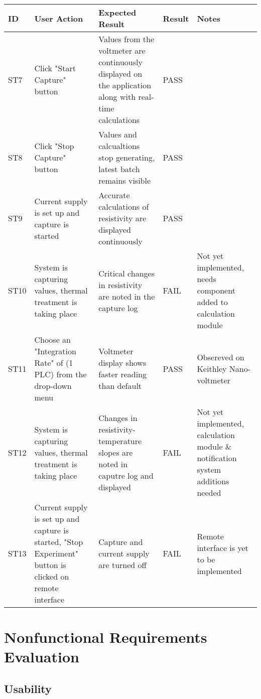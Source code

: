 \documentclass[12pt, titlepage]{article}
\begin{document}
\begin{table}[H]
	\centering
	\begin{tabular}{|p{0.85cm}|p{3.5cm}|p{3.5cm}|p{1.3cm}|p{3cm}|}
		\hline
		\textbf{ID} & \textbf{User Action} & \textbf{Expected Result}  & \textbf{Result}  & \textbf{Notes}  \\ \hline
		ST7 & Click "Start Capture" button & Values from the voltmeter are continuously displayed on the application along with real-time calculations & PASS & \\ \hline
		ST8 & Click "Stop Capture" button & Values and calcualtions stop generating, latest batch remains visible & PASS &\\ \hline
		ST9 & Current supply is set up and capture is started & Accurate calculations of resistivity are displayed continuously & PASS &\\ \hline
		ST10 & System is capturing values, thermal treatment is taking place & Critical changes in resistivity are noted in the capture log & FAIL & Not yet implemented, needs component added to calculation module\\ \hline
		ST11 & Choose an "Integration Rate" of (1 PLC) from the drop-down menu & Voltmeter display shows faster reading than default & PASS & Obsereved on Keithley Nano-voltmeter\\ \hline
		ST12 & System is capturing values, thermal treatment is taking place & Changes in resistivity-temperature slopes are noted in caputre log and displayed & FAIL & Not yet implemented, calculation module \& notification system additions needed\\ \hline
		ST13 & Current supply is set up and capture is started, "Stop Experiment" button is clicked on remote interface & Capture and current supply are turned off & FAIL & Remote interface is yet to be implemented\\ \hline
	\end{tabular}
\end{table}

\newpage

\section{Nonfunctional Requirements Evaluation}

\subsection{Usability}
		
\end{document}

